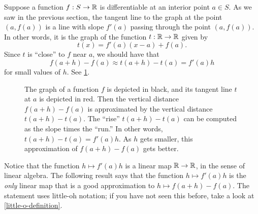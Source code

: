Suppose a function $f : S \to \mathbb{R}$ is differentiable at an interior point $a \in S$. As we saw in the previous section, the tangent line to the graph at the point $(a, f(a))$ is a line with slope $f'(a)$ passing through the point $(a, f(a))$. In other words, it is the graph of the function $t : \mathbb{R} \to \mathbb{R}$ given by
\[ t(x) = f'(a)(x-a) + f(a). \]
Since $t$ is ``close'' to $f$ near $a$, we should have that
\[ f(a+h)-f(a) \approx t(a+h) - t(a) = f'(a)h \]
for small values of $h$. See \cref{figure-linear-approximation}. 
\begin{figure}[ht]
	\begin{center}
	\end{center}
	\caption{The graph of a function $f$ is depicted in black, and its tangent line $t$ at $a$ is depicted in red. Then the vertical distance $f(a+h)-f(a)$ is approximated by the vertical distance $t(a+h)-t(a)$. The ``rise'' $t(a+h)-t(a)$ can be computed as the slope times the ``run.'' In other words, $t(a+h)-t(a) = f'(a)h$. As $h$ gets smaller, this approximation of $f(a+h) - f(a)$ gets better.}  \label{figure-linear-approximation}
\end{figure}

Notice that the function $h \mapsto f'(a)h$ is a linear map $\mathbb{R} \to \mathbb{R}$, in the sense of linear algebra. The following result says that the function $h \mapsto f'(a)h$ is the \emph{only} linear map that is a good approximation to $h \mapsto f(a+h)-f(a)$. The statement uses little-oh notation; if you have not seen this before, take a look at \cref{little-o-definition}.

